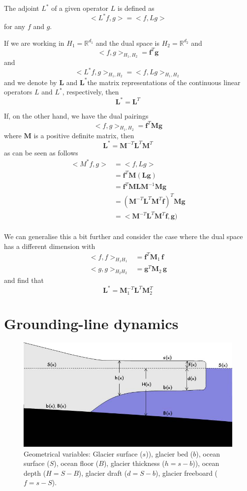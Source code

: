 \documentclass[10pt,a4paper]{book}
\begin{document}
The adjoint $L^\ast$ of a given operator $L$ is defined as
\[
< L^\ast f, g > =< f, L g>  
\]
for any $f$ and $g$. 

If we are working in $H_1=\mathbb{R}^{d_1}$ and the dual space is
$H_2=\mathbb{R}^{d_2}$ and
\[
 < f ,g >_{H_1 , H_2} = \bm{f}^T \bm{g}
\]
and
\[
< L^\ast f, g >_{H_1 , H_2}  =< f, L g>_{H_1 , H_2}   
\]
and we denote by $\bm{L}$ and $\bm{L}^\ast$the matrix representations
of the continuous linear operators $L$ and $L^\ast$, respectively,
then 
\[
 \bm{L}^\ast = \bm{L}^T
\]

If,  on the other hand, we have the dual pairings
\[
 < f ,g >_{H_1 , H_2}  = \bm{f}^T \bm{M} \bm{g}
\]
where $\bm{M}$ is a positive definite matrix, then
\[
\bm{L}^\ast=\bm{M}^{-T} \bm{L}^T \bm{M}^T
\] 
as can be seen as follows
\begin{align*}
 <M^\ast f, g> &= < f, L g> \\
              &= \bm{f}^T \bm{M} ( \bm{L} \bm{g}) \\
              &= \bm{f}^T \bm{M} \bm{L} \bm{M}^{-1} \bm{M}  \bm{g} \\
              &= (\bm{M}^{-T} \bm{L}^T \bm{M}^T \bm{f})^T  \bm{M}  \bm{g} \\
              &= <\bm{M}^{-T} \bm{L}^T \bm{M}^T \bm{f} ,  \bm{g}) \\
\end{align*}

We can generalise this a bit further and consider the case where the
dual space has a different dimension with
\begin{align*}
  <f,f>_{H_1 H_1} &= \bm{f}^T \bm{M}_1 \,\bm{f} \\
  <g,g>_{H_2 H_2} &= \bm{g}^T \bm{M}_2 \, \bm{g}
\end{align*}
and find that 
\[
\bm{L}^\ast=\bm{M}_1^{-T} \bm{L}^T \bm{M}_2^T
\]



\chapter{Grounding-line dynamics}


\begin{figure}
\centerline{\includegraphics[width=12cm]{ProblemGeometry.jpg}}
\caption{Geometrical variables: Glacier surface ($s$)), glacier bed ($b$), ocean surface ($S$), ocean floor ($B$), 
glacier thickness ($h=s-b$)), ocean depth ($H=S-B$), glacier draft ($d=S-b$), glacier freeboard ($f=s-S$). 
\label{fig:PG2}}
\end{figure}
\end{document}
